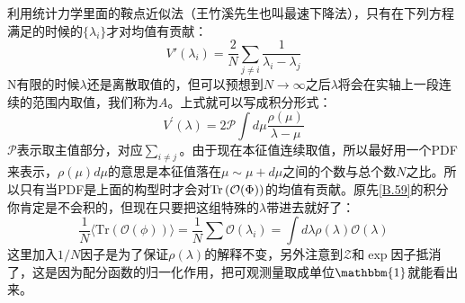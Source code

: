 利用统计力学里面的鞍点近似法（王竹溪先生也叫最速下降法），只有在下列方程满足的时候的$\{\lambda_i\}$才对均值有贡献：
\begin{equation}
	V'(\lambda_i)=\frac2N\sum_{j\neq i}\frac1{\lambda_i-\lambda_j}
\end{equation}
N有限的时候$\lambda$还是离散取值的，但可以预想到$N\to\infty$之后$\lambda$将会在实轴上一段连续的范围内取值，我们称为$A$。上式就可以写成积分形式：
\begin{equation}\label{B.62}
	V^{\prime}(\lambda)=2\mathcal{P}\int d\mu\frac{\rho(\mu)}{\lambda-\mu}
\end{equation}
$\mathcal{P}$表示取主值部分，对应$\sum_{i\neq j}$。由于现在本征值连续取值，所以最好用一个PDF来表示，$\rho(\mu)d\mu$的意思是本征值落在$\mu\sim\mu+d\mu$之间的个数与总个数$N$之比。所以只有当PDF是上面的构型时才会对$\Tr\left(\mathcal{O}(\Phi)\right)$的均值有贡献。原先\ref{B.59}的积分你肯定是不会积的，但现在只要把这组特殊的$\lambda$带进去就好了：
\begin{equation}
	\frac{1}{N}\langle\mathrm{Tr}(\mathcal{O}(\phi))\rangle=\frac{1}{N}\sum\mathcal{O}(\lambda_i)=\int d\lambda\rho(\lambda)\mathcal{O}(\lambda)
\end{equation}
这里加入$1/N$因子是为了保证$\rho(\lambda)$的解释不变，另外注意到$\mathcal{Z}$和$\exp$因子抵消了，这是因为配分函数的归一化作用，把可观测量取成单位$\mathbbm{1}$就能看出来。


